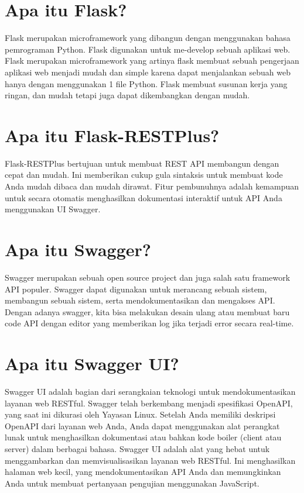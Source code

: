 \documentclass[12pt]{article}
\begin{document}
\section{Apa itu Flask?}
Flask merupakan microframework yang dibangun dengan
menggunakan bahasa pemrograman Python. Flask digunakan
untuk me-develop sebuah aplikasi web. Flask merupakan
microframework yang artinya flask membuat sebuah pengerjaan
aplikasi web menjadi mudah dan simple karena dapat menjalankan
sebuah web hanya dengan menggunakan 1 file Python. Flask
membuat susunan kerja yang ringan, dan mudah tetapi juga dapat
dikembangkan dengan mudah\cite{gunawan2018aplikasi}.

\section{Apa itu Flask-RESTPlus?}
Flask-RESTPlus bertujuan untuk membuat REST API membangun dengan cepat dan mudah. Ini memberikan cukup gula sintaksis untuk membuat kode Anda mudah dibaca dan mudah dirawat. Fitur pembunuhnya adalah kemampuan untuk secara otomatis menghasilkan dokumentasi interaktif untuk API Anda menggunakan UI Swagger.

\section{Apa itu Swagger?}
Swagger merupakan sebuah open source project dan juga salah satu framework API populer. Swagger dapat digunakan untuk merancang sebuah sistem, membangun sebuah sistem, serta mendokumentasikan dan mengakses API. Dengan adanya swagger, kita bisa melakukan desain ulang atau membuat baru code API dengan editor yang memberikan log jika terjadi error secara real-time.

\section{Apa itu Swagger UI?}
Swagger UI adalah bagian dari serangkaian teknologi untuk mendokumentasikan layanan web RESTful. Swagger telah berkembang menjadi spesifikasi OpenAPI, yang saat ini dikurasi oleh Yayasan Linux. Setelah Anda memiliki deskripsi OpenAPI dari layanan web Anda, Anda dapat menggunakan alat perangkat lunak untuk menghasilkan dokumentasi atau bahkan kode boiler (client atau server) dalam berbagai bahasa.
Swagger UI adalah alat yang hebat untuk menggambarkan dan memvisualisasikan layanan web RESTful. Ini menghasilkan halaman web kecil, yang mendokumentasikan API Anda dan memungkinkan Anda untuk membuat pertanyaan pengujian menggunakan JavaScript.
\end{document}
